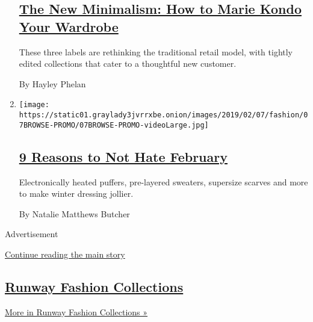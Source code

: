 \begin{enumerate}
  \hypertarget{the-new-minimalism-how-to-marie-kondo-your-wardrobe}{%
  \subsection{\texorpdfstring{\href{/2019/02/13/style/how-to-marie-kondo-your-wardrobe.html}{The
  New Minimalism: How to Marie Kondo Your
  Wardrobe}}{The New Minimalism: How to Marie Kondo Your Wardrobe}}\label{the-new-minimalism-how-to-marie-kondo-your-wardrobe}}

  These three labels are rethinking the traditional retail model, with
  tightly edited collections that cater to a thoughtful new customer.

  By Hayley Phelan
\item
  \texttt{[image: https://static01.graylady3jvrrxbe.onion/images/2019/02/07/fashion/07BROWSE-PROMO/07BROWSE-PROMO-videoLarge.jpg]}

  \hypertarget{9-reasons-to-not-hate-february}{%
  \subsection{\texorpdfstring{\href{/2019/02/06/style/9-reasons-to-not-hate-february.html}{9
  Reasons to Not Hate
  February}}{9 Reasons to Not Hate February}}\label{9-reasons-to-not-hate-february}}

  Electronically heated puffers, pre-layered sweaters, supersize scarves
  and more to make winter dressing jollier.

  By Natalie Matthews Butcher
\end{enumerate}

Advertisement

\protect\hyperlink{after-mid4}{Continue reading the main story}

\hypertarget{runway-fashion-collections}{%
\subsection{\texorpdfstring{\href{/spotlight/fashion-runway-slideshows}{Runway
Fashion
Collections}}{Runway Fashion Collections}}\label{runway-fashion-collections}}

\href{/spotlight/fashion-runway-slideshows}{More in Runway Fashion
Collections »}

